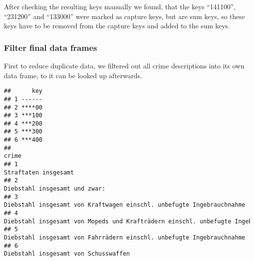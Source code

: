 \documentclass[
]{article}
\newenvironment{Shaded}{\begin{snugshade}}{\end{snugshade}}
\newcommand{\KeywordTok}[1]{\textcolor[rgb]{0.13,0.29,0.53}{\textbf{#1}}}
\newcommand{\NormalTok}[1]{#1}
\newcommand{\OperatorTok}[1]{\textcolor[rgb]{0.81,0.36,0.00}{\textbf{#1}}}
\newcommand{\StringTok}[1]{\textcolor[rgb]{0.31,0.60,0.02}{#1}}
\begin{document}
After checking the resulting keys manually we found, that the keys
``141100'', ``231200'' and ``133000'' were marked as capture keys, but
are sum keys, so these keys have to be removed from the capture keys and
added to the sum keys.

\begin{Shaded}
\end{Shaded}

\hypertarget{filter-final-data-frames}{%
\subsubsection{Filter final data
frames}\label{filter-final-data-frames}}

First to reduce duplicate data, we filtered out all crime descriptions
into its own data frame, to it can be looked up afterwards.

\begin{Shaded}
\end{Shaded}

\begin{verbatim}
##      key
## 1 ------
## 2 ****00
## 3 ***100
## 4 ***200
## 5 ***300
## 6 ***400
##                                                                               crime
## 1                                                              Straftaten insgesamt
## 2                                                     Diebstahl insgesamt und zwar:
## 3             Diebstahl insgesamt von Kraftwagen einschl. unbefugte Ingebrauchnahme
## 4 Diebstahl insgesamt von Mopeds und Krafträdern einschl. unbefugte Ingebrauchnahme
## 5             Diebstahl insgesamt von Fahrrädern einschl. unbefugte Ingebrauchnahme
## 6                                              Diebstahl insgesamt von Schusswaffen
\end{verbatim}
\end{document}
